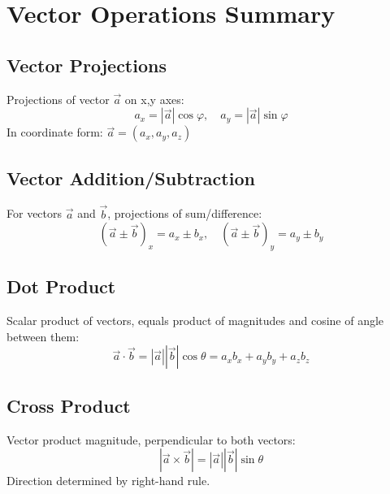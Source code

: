 \documentclass{article}
\begin{document}
\section*{Vector Operations Summary}

\subsection*{Vector Projections}
Projections of vector $\vec{a}$ on x,y axes:
\[a_x = |\vec{a}|\cos\varphi, \quad a_y = |\vec{a}|\sin\varphi\]
In coordinate form: $\vec{a} = (a_x, a_y, a_z)$

\subsection*{Vector Addition/Subtraction}
For vectors $\vec{a}$ and $\vec{b}$, projections of sum/difference:
\[(\vec{a} \pm \vec{b})_x = a_x \pm b_x, \quad (\vec{a} \pm \vec{b})_y = a_y \pm b_y\]

\subsection*{Dot Product}
Scalar product of vectors, equals product of magnitudes and cosine of angle between them:
\[\vec{a} \cdot \vec{b} = |\vec{a}||\vec{b}|\cos\theta = a_x b_x + a_y b_y + a_z b_z\]

\subsection*{Cross Product}
Vector product magnitude, perpendicular to both vectors:
\[|\vec{a} \times \vec{b}| = |\vec{a}||\vec{b}|\sin\theta\]
Direction determined by right-hand rule.
\end{document}
